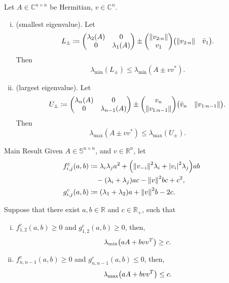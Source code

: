 \documentclass[handout]{beamer}
\theoremstyle{plain}
\theoremstyle{definition}
\theoremstyle{remark}
\newcommand{\MB}[1]{\mathbb{#1}}
\newcommand{\lmin}{\lambda_{\min}}
\newcommand{\lmax}{\lambda_{\max}}
\begin{document}
\begin{frame}
	\begin{theorem}
		\label{thm:ipsen}
		Let $A \in \MB{C}^{n \times n}$ be Hermitian, $v \in \MB{C}^n$.
		\begin{enumerate}[(i)]
			\item<+-> (smallest eigenvalue). Let
				\begin{equation*}
					L_{\pm} \coloneqq \mqty(\lambda_2(A) & 0 \\ 0 & \lambda_1(A)) \pm
					\mqty(\norm{v_{2:n}} \\ v_1) \mqty(\norm{v_{2:n}} & \bar{v}_1).
				\end{equation*}
				Then
				\begin{equation*}
					\lmin(L_{\pm}) \le \lmin(A \pm v v^\ast).
				\end{equation*}
			\item<+-> (largest eigenvalue). Let
				\begin{equation*}
					U_{\pm} \coloneqq \mqty(\lambda_n(A) & 0 \\ 0 & \lambda_{n-1}(A)) \pm
					\mqty(v_n \\ \norm{v_{1:n-1}}) \mqty(\bar{v}_n & \norm{v_{1:n-1}}).
				\end{equation*}
				Then
				\begin{equation*}
					\lmax(A \pm v v^\ast) \le \lmax(U_{\pm}).
				\end{equation*}
		\end{enumerate}
	\end{theorem}
\end{frame}

\begin{frame}{Main Result}
	Given $A \in \MB{S}^{n \times n}$, and $v \in \MB{R}^n$, let 
	\begin{align*}
		f_{i,j}^c(a, b) &\coloneqq \lambda_i \lambda_j a^2 + \qty(\norm{v_{-i}}^2
		\lambda_i + \abs{v_i}^2 \lambda_j) a b \\
		&\quad - \qty(\lambda_i + \lambda_j) a c - \norm{v}^2 b c + c^2,\\
		g_{i,j}^c(a, b) &\coloneqq \qty(\lambda_1 + \lambda_2) a + \norm{v}^2 b -
		2 c.
	\end{align*}
	\pause

	\begin{theorem}
		Suppose that there exist $a, b \in \MB{R}$ and $c \in \MB{R}_{+}$, such
		that 
		\begin{enumerate}[(i)]
			\item $f_{1, 2}^c(a,b) \ge 0$ and $g_{1, 2}^c(a,b) \ge 0$, then,
				\begin{equation*}
					\lambda_{\min} \qty(a A + b v v^T) \ge c.
				\end{equation*}
			\item $f_{n, n-1}^c(a,b) \ge 0$ and $g_{n, n-1}^c(a,b) \le 0$, then,
				\begin{equation*}
					\lambda_{\max} \qty(a A + b v v^T) \le c.
				\end{equation*}
		\end{enumerate}
	\end{theorem}
\end{frame}
\end{document}
